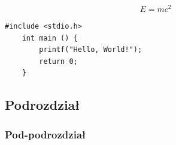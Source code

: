 \lipsum[2] \cite{min2017deep} %

\begin{equ}[!ht]                        %
  \begin{equation}                      %
    E=mc^2                              %
  \end{equation}                        %
\end{equ}                               %

\lipsum[2] %

                                                             
\begin{lstlisting}[caption=Podpis listingu,label=code1]     
    #include <stdio.h>                                      
    int main () {                                           
        printf("Hello, World!");                            
        return 0;                                           
    }                                                       
\end{lstlisting}                                            
                                                            

\subsection{Podrozdział}

\lipsum[1-15]    %

\subsubsection{Pod-podrozdział}

\lipsum[1-5]    %
